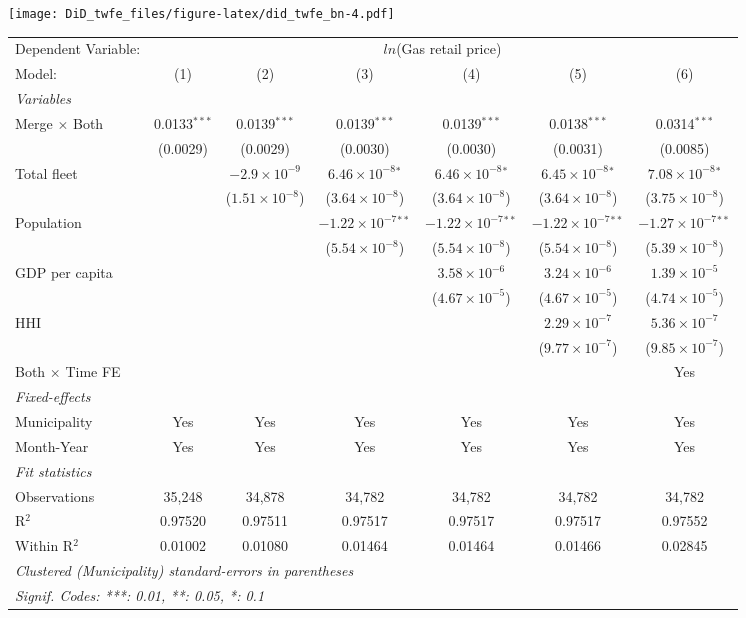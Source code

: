 \documentclass[
]{article}
\begin{document}
\texttt{[image: DiD\_twfe\_files/figure-latex/did\_twfe\_bn-4.pdf]}

\begin{tabular}{lcccccc}
\tabularnewline\midrule\midrule
Dependent Variable:&\multicolumn{6}{c}{$ln$(Gas retail price)}\\
Model:&(1) & (2) & (3) & (4) & (5) & (6)\\
\midrule \emph{Variables}&   &   &   &   &   &  \\
Merge $\times $ Both & 0.0133$^{***}$ & 0.0139$^{***}$ & 0.0139$^{***}$ & 0.0139$^{***}$ & 0.0138$^{***}$ & 0.0314$^{***}$\\
  &(0.0029) & (0.0029) & (0.0030) & (0.0030) & (0.0031) & (0.0085)\\
Total fleet &    & $-2.9\times 10^{-9}$ & $6.46\times 10^{-8}$$^{*}$ & $6.46\times 10^{-8}$$^{*}$ & $6.45\times 10^{-8}$$^{*}$ & $7.08\times 10^{-8}$$^{*}$\\
  &   & ($1.51\times 10^{-8}$) & ($3.64\times 10^{-8}$) & ($3.64\times 10^{-8}$) & ($3.64\times 10^{-8}$) & ($3.75\times 10^{-8}$)\\
Population &    &    & $-1.22\times 10^{-7}$$^{**}$ & $-1.22\times 10^{-7}$$^{**}$ & $-1.22\times 10^{-7}$$^{**}$ & $-1.27\times 10^{-7}$$^{**}$\\
  &   &    & ($5.54\times 10^{-8}$) & ($5.54\times 10^{-8}$) & ($5.54\times 10^{-8}$) & ($5.39\times 10^{-8}$)\\
GDP per capita &    &    &    & $3.58\times 10^{-6}$ & $3.24\times 10^{-6}$ & $1.39\times 10^{-5}$\\
  &   &    &    & ($4.67\times 10^{-5}$) & ($4.67\times 10^{-5}$) & ($4.74\times 10^{-5}$)\\
HHI &    &    &    &    & $2.29\times 10^{-7}$ & $5.36\times 10^{-7}$\\
  &   &    &    &    & ($9.77\times 10^{-7}$) & ($9.85\times 10^{-7}$)\\
Both $\times$ Time FE &  &  &  &  &  & Yes\\
\midrule \emph{Fixed-effects}&   &   &   &   &   &  \\
Municipality & Yes & Yes & Yes & Yes & Yes & Yes\\
Month-Year & Yes & Yes & Yes & Yes & Yes & Yes\\
\midrule \emph{Fit statistics}&  & & & & & \\
Observations & 35,248&34,878&34,782&34,782&34,782&34,782\\
R$^2$ & 0.97520&0.97511&0.97517&0.97517&0.97517&0.97552\\
Within R$^2$ & 0.01002&0.01080&0.01464&0.01464&0.01466&0.02845\\
\midrule\midrule\multicolumn{7}{l}{\emph{Clustered (Municipality) standard-errors in parentheses}}\\
\multicolumn{7}{l}{\emph{Signif. Codes: ***: 0.01, **: 0.05, *: 0.1}}\\
\end{tabular}
\end{document}
